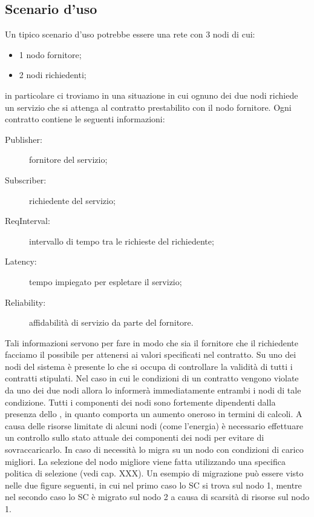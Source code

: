 \subsection{Scenario d'uso}
Un tipico scenario d'uso potrebbe essere una rete con 3 nodi di cui:
\begin{itemize}
\item 1 nodo fornitore;
\item 2 nodi richiedenti;
\end{itemize}
in particolare ci troviamo in una situazione in cui ognuno dei due nodi richiede un servizio che si attenga al contratto prestabilito con il nodo fornitore. Ogni contratto contiene le seguenti informazioni:
\begin{description}
\item[Publisher:] fornitore del servizio;
\item[Subscriber:] richiedente del servizio;
\item[ReqInterval:] intervallo di tempo tra le richieste del richiedente;
\item[Latency:] tempo impiegato per espletare il servizio;
\item[Reliability:] affidabilità di servizio da parte del fornitore.
\end{description}
Tali informazioni servono per fare in modo che sia il fornitore che il richiedente facciamo il possibile per attenersi ai valori specificati nel contratto.
Su uno dei nodi del sistema è presente lo  che si occupa di controllare la validità di tutti i contratti stipulati. Nel caso in cui le condizioni di un contratto vengono violate da uno dei due nodi allora lo  informerà immediatamente entrambi i nodi di tale condizione. Tutti i componenti dei nodi sono fortemente dipendenti dalla presenza dello , in quanto comporta un aumento oneroso in termini di calcoli. A causa delle risorse limitate di alcuni nodi (come l'energia) è necessario effettuare un controllo sullo stato attuale dei componenti dei nodi per evitare di sovraccaricarlo. In caso di necessità lo  migra su un nodo con condizioni di carico migliori. La selezione del nodo migliore viene fatta utilizzando una specifica politica di selezione (vedi cap. XXX). Un esempio di migrazione può essere visto nelle due figure seguenti, in cui nel primo caso lo SC si trova sul nodo 1, mentre nel secondo caso lo SC è migrato sul nodo 2 a causa di scarsità di risorse sul nodo 1.
